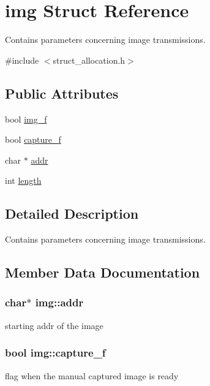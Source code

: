 \hypertarget{structimg}{}\section{img Struct Reference}
\label{structimg}


Contains parameters concerning image transmissions.  




{\ttfamily \#include $<$struct\+\_\+allocation.\+h$>$}

\subsection*{Public Attributes}
\begin{DoxyCompactItemize}
\item 
bool \hyperlink{structimg_a81e3c13ecf3acc548884bb27ba964822}{img\+\_\+f}
\item 
bool \hyperlink{structimg_af8011a6ad3945ae54a1a32e842cb116a}{capture\+\_\+f}
\item 
char $\ast$ \hyperlink{structimg_ac4bd7b35f4bd0beebc5ed74684c627eb}{addr}
\item 
int \hyperlink{structimg_a4d4e3f1b208a7acc1c6f3cd9f7ffaa77}{length}
\end{DoxyCompactItemize}


\subsection{Detailed Description}
Contains parameters concerning image transmissions. 

\subsection{Member Data Documentation}
\subsubsection[{\texorpdfstring{addr}{addr}}]{\setlength{\rightskip}{0pt plus 5cm}char$\ast$ img\+::addr}\hypertarget{structimg_ac4bd7b35f4bd0beebc5ed74684c627eb}{}\label{structimg_ac4bd7b35f4bd0beebc5ed74684c627eb}
starting addr of the image 
\subsubsection[{\texorpdfstring{capture\+\_\+f}{capture_f}}]{\setlength{\rightskip}{0pt plus 5cm}bool img\+::capture\+\_\+f}\hypertarget{structimg_af8011a6ad3945ae54a1a32e842cb116a}{}\label{structimg_af8011a6ad3945ae54a1a32e842cb116a}
flag when the manual captured image is ready 

